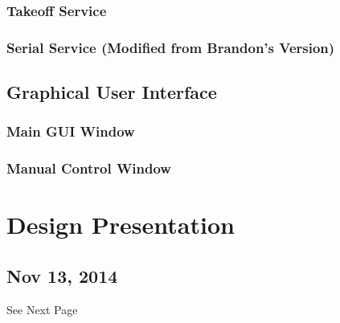 \documentclass[pdftex,11pt]{article}
\begin{document}
		\subsubsection{Takeoff Service}
			
					
		\subsubsection{Serial Service (Modified from Brandon's Version)}
			
				
			
	\subsection{Graphical User Interface}
		\subsubsection{Main GUI Window}
			
		\subsubsection{Manual Control Window}
			

\clearpage


\section{Design Presentation}
\label{sec:DesignPresentation}
\subsection{Nov 13, 2014}
See Next Page








\end{document}
